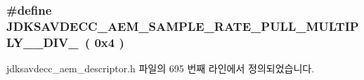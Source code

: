 \subsubsection[{\texorpdfstring{J\+D\+K\+S\+A\+V\+D\+E\+C\+C\+\_\+\+A\+E\+M\+\_\+\+S\+A\+M\+P\+L\+E\+\_\+\+R\+A\+T\+E\+\_\+\+P\+U\+L\+L\+\_\+\+M\+U\+L\+T\+I\+P\+L\+Y\+\_\+25\+\_\+\+D\+I\+V\+\_\+24}{JDKSAVDECC_AEM_SAMPLE_RATE_PULL_MULTIPLY_25_DIV_24}}]{\setlength{\rightskip}{0pt plus 5cm}\#define J\+D\+K\+S\+A\+V\+D\+E\+C\+C\+\_\+\+A\+E\+M\+\_\+\+S\+A\+M\+P\+L\+E\+\_\+\+R\+A\+T\+E\+\_\+\+P\+U\+L\+L\+\_\+\+M\+U\+L\+T\+I\+P\+L\+Y\+\_\+\_\+\+D\+I\+V\+\_~( 0x4 )}\hypertarget{group__pull_gad0aef42fa532972fa8571d9943d10e4b}{}\label{group__pull_gad0aef42fa532972fa8571d9943d10e4b}


jdksavdecc\+\_\+aem\+\_\+descriptor.\+h 파일의 695 번째 라인에서 정의되었습니다.

